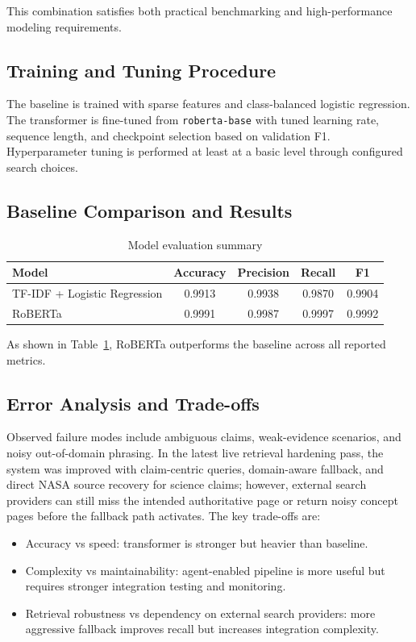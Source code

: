 \documentclass[11pt,a4paper]{article}
\begin{document}
This combination satisfies both practical benchmarking and high-performance modeling requirements.

\subsection{Training and Tuning Procedure}
The baseline is trained with sparse features and class-balanced logistic regression. The transformer is fine-tuned from \texttt{roberta-base} with tuned learning rate, sequence length, and checkpoint selection based on validation F1. Hyperparameter tuning is performed at least at a basic level through configured search choices.

\subsection{Baseline Comparison and Results}
\begin{table}[H]
\centering
\caption{Model evaluation summary}
\label{tab:model-results}
\begin{tabular}{lcccc}
\toprule
Model & Accuracy & Precision & Recall & F1 \\
\midrule
TF-IDF + Logistic Regression & 0.9913 & 0.9938 & 0.9870 & 0.9904 \\
RoBERTa & 0.9991 & 0.9987 & 0.9997 & 0.9992 \\
\bottomrule
\end{tabular}
\end{table}

As shown in Table~\ref{tab:model-results}, RoBERTa outperforms the baseline across all reported metrics.

\subsection{Error Analysis and Trade-offs}
Observed failure modes include ambiguous claims, weak-evidence scenarios, and noisy out-of-domain phrasing. In the latest live retrieval hardening pass, the system was improved with claim-centric queries, domain-aware fallback, and direct NASA source recovery for science claims; however, external search providers can still miss the intended authoritative page or return noisy concept pages before the fallback path activates. The key trade-offs are:
\begin{itemize}[leftmargin=1.2em]
  \item Accuracy vs speed: transformer is stronger but heavier than baseline.
  \item Complexity vs maintainability: agent-enabled pipeline is more useful but requires stronger integration testing and monitoring.
  \item Retrieval robustness vs dependency on external search providers: more aggressive fallback improves recall but increases integration complexity.
\end{itemize}
\end{document}
